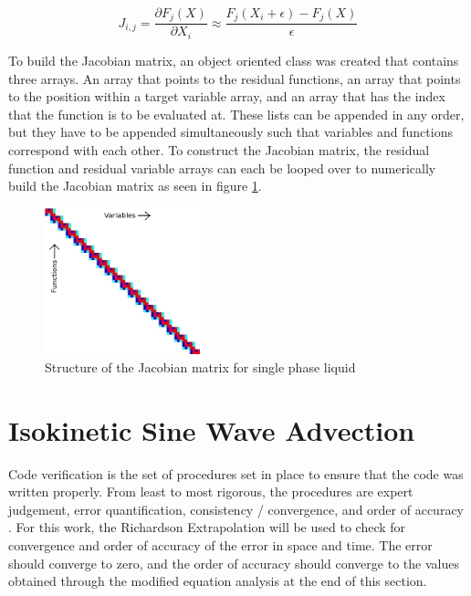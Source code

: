 \documentclass{mc2015}
\begin{document}
    \begin{equation}
    	\label{eq:jac_numerical}
    	J_{i,j}=\frac{ \partial F_{j}(X)}{\partial X_{i}}
    	      \approx \frac{F_{j}(X_{i}+\epsilon)-F_{j}(X)}{\epsilon}
    \end{equation}
    
	To build the Jacobian matrix, an object oriented class was created that
    contains three arrays. An array that points to the residual functions, an
    array that points to the position within a target variable array, and an
    array that has the index that the function is to be evaluated at. These
    lists can be appended in any order, but they have to be appended
    simultaneously such that variables and functions correspond with each
    other. To construct the Jacobian matrix, the residual function and
    residual variable arrays can each be looped over to numerically build the
    Jacobian matrix as seen in figure \ref{fig:Jacobian_Setup}. 
    
    \begin{figure}[!h]
    	\centering
    	\includegraphics[width=0.40\textwidth]{images/Jacobian_Setup}
    	\caption{Structure of the Jacobian matrix for single phase liquid}
    	\label{fig:Jacobian_Setup}
    \end{figure}

\section{Isokinetic Sine Wave Advection}

Code verification is the set of procedures set in place to ensure that the code
was written properly. From least to most rigorous, the procedures are expert
judgement, error quantification, consistency / convergence, and order of
accuracy \cite{VV_Book}. For this work, the Richardson Extrapolation will be
used to check for convergence and order of accuracy of the error in space and
time. The error should converge to zero, and the order of accuracy should
converge to the values obtained through the modified equation analysis at the
end of this section.
 
\end{document}
